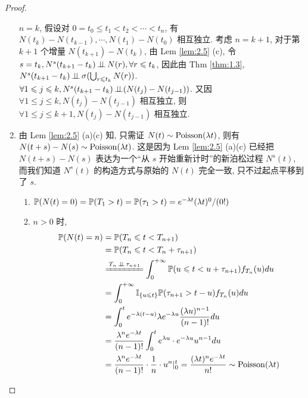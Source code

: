 \begin{proof}
\begin{enumerate}
$n=k$, 假设对 $0=t_0\leq t_1<t_2<\cdots<t_n$, 有 $N(t_k)-N(t_{k-1}),\cdots,N(t_1)-N(t_0)$ 相互独立. 考虑 $n=k+1$, 对于第 $k+1$ 个增量 $N(t_{k+1})-N(t_k)$, 由 Lem \ref{lem:2.5} (c), 令 $s=t_k, N^{s}(t_{k+1}-t_k)\operatorname{\perp\!\!\!\perp} N(r), \forall r\leqslant t_k$, 因此由 Thm \ref{thm:1.3}, $N^{s}(t_{k+1}-t_k)\operatorname{\perp\!\!\!\perp} \sigma(\bigcup_{r\leqslant t_k}N(r))$. $\forall 1\leqslant j\leqslant k, N^{s}(t_{k+1}-t_k)\operatorname{\perp\!\!\!\perp} (N(t_j)-N(t_{j-1}))$. 又因 $\forall 1\leq j\leq k, N(t_j)-N(t_{j-1})$ 相互独立, 则 $\forall 1\leq j\leq k+1, N(t_j)-N(t_{j-1})$ 相互独立.
    \item 由 Lem \ref{lem:2.5} (a)(c) 知, 只需证 $N(t)\sim \operatorname{Poisson}(\lambda t)$, 则有 $N(t+s)-N(s)\sim\operatorname{Poisson}(\lambda t)$. 这是因为 Lem \ref{lem:2.5} (a)(c) 已经把 $N(t+s)-N(s)$ 表达为一个``从 $s$ 开始重新计时''的新泊松过程 $N^s(t)$, 而我们知道 $N^s(t)$ 的构造方式与原始的 $N(t)$ 完全一致, 只不过起点平移到了 $s$.
    \begin{enumerate}
        \item $\mathbb{P}(N(t)=0)=\mathbb{P}(T_1>t)=\mathbb{P}(\tau_1>t)=e^{-\lambda t}(\lambda t)^0/(0!)$
        \item $n>0$ 时, 
        \[
        \begin{aligned}
            \PP(N(t)=n) &=\PP(T_n\leq t<T_{n+1})\\
            &=\PP(T_n\leq t<T_n+\tau_{n+1})\\
            &\xlongequal{T_n\ind \tau_{n+1}}\int_0^{+\infty}\PP(u\leq t<u+\tau_{n+1})f_{T_n}(u)du\\
            &=\int_0^{+\infty}\II_{\{u\leq t\}}\PP(\tau_{n+1}>t-u)f_{T_n}(u)du\\
            &=\int_0^t e^{-\lambda (t-u)}\lambda e^{-\lambda u}\frac{(\lambda u)^{n-1}}{(n-1)!}du\\
            &=\frac{\lambda^n e^{-\lambda t}}{(n-1)!}\int_0^t e^{\lambda u}\cdot e^{-\lambda u}u^{n-1}du\\
            &=\frac{\lambda^n e^{-\lambda t}}{(n-1)!}\cdot \frac{1}{n}\cdot u^n|_0^t=\frac{(\lambda t)^n e^{-\lambda t}}{n!}\sim \Poi(\lambda t)
        \end{aligned}
        \]
    \end{enumerate}
\end{enumerate}
\end{proof}

